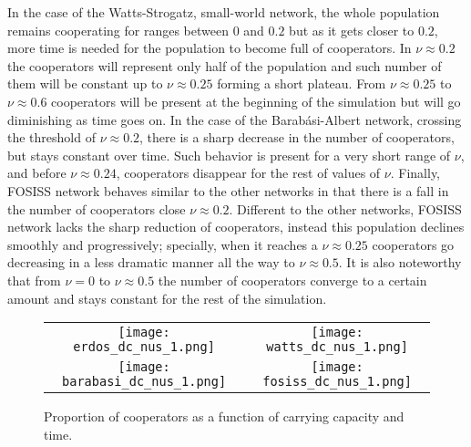 \documentclass[11pt]{article}
\begin{document}
In the case of the Watts-Strogatz, small-world network, the whole population
remains cooperating for ranges between $0$ and $0.2$ but as it gets closer to
$0.2$, more time is needed for the population to become full of cooperators. In
$\nu \approx 0.2$ the cooperators will represent only half of the population and
such number of them will be constant up to $\nu \approx 0.25$ forming a short
plateau. From $\nu \approx 0.25$ to $\nu \approx 0.6$ cooperators will be
present at the beginning of the simulation but will go diminishing as time goes on.
In the case of the Barab\'asi-Albert network, crossing the threshold of $\nu
\approx 0.2$, there is a sharp decrease in the number of cooperators, but stays
constant over time. Such behavior is present for a very short range of $\nu$, and
before $\nu \approx 0.24$, cooperators disappear for the rest of values of
$\nu$. Finally, FOSISS network behaves similar to the other networks in that
there is a fall in the number of cooperators close  $\nu \approx 0.2$. Different
to the other networks, FOSISS network lacks the sharp reduction of
cooperators, instead this population declines smoothly and progressively;
specially, when it reaches a $\nu \approx 0.25$ cooperators go 
decreasing in a less dramatic manner all the way to $\nu \approx 0.5$. It is
also noteworthy that from $\nu = 0$ to $\nu \approx 0.5$ the number of
cooperators converge to a certain amount and stays constant for the rest of the
simulation. 




\begin{figure} [h!]
\centering
\begin{tabular}{cc}

\texttt{[image: erdos\_dc\_nus\_1.png]} & \texttt{[image: watts\_dc\_nus\_1.png]} \\
\texttt{[image: barabasi\_dc\_nus\_1.png]} & \texttt{[image: fosiss\_dc\_nus\_1.png]}
\end{tabular}
\caption{Proportion of cooperators as a function of carrying capacity and time.}\label{CD}
\end{figure}

\FloatBarrier
\end{document}
